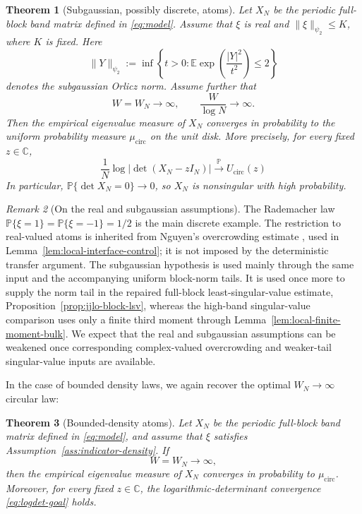 \documentclass[11pt,reqno]{amsart}
\numberwithin{equation}{section}
\newtheorem{theorem}{Theorem}[section]
\theoremstyle{definition}
\theoremstyle{remark}
\newtheorem{remark}[theorem]{Remark}
\newcommand{\C}{\mathbb C}
\newcommand{\E}{\mathbb E}
\newcommand{\Pp}{\mathbb P}
\newcommand{\1}{\mathbf 1}
\newcommand{\cir}{\mathrm{circ}}
\renewcommand{\P}{\mathbb P}
\begin{document}
\begin{theorem}[Subgaussian, possibly discrete, atoms]
\label{thm:main}
Let \(X_N\) be the periodic full-block band matrix defined in
\eqref{eq:model}.  Assume that \(\xi\) is real and
\(\|\xi\|_{\psi_2}\le K\), where \(K\) is fixed.  Here
\[
 \|Y\|_{\psi_2}:=\inf\left\{t>0:
   \E\exp\left(\frac{|Y|^2}{t^2}\right)\leq2\right\}
\]
denotes the subgaussian Orlicz norm.  Assume further that
\begin{equation}
 W=W_N\longrightarrow\infty,
 \qquad \frac{W}{\log N}\longrightarrow\infty.
 \label{eq:bandwidth}
\end{equation}
Then the empirical eigenvalue measure of \(X_N\) converges in probability
to the uniform probability measure \(\mu_{\cir}\) on the unit disk.
More precisely, for every fixed \(z\in\C\),
\begin{equation}
 \frac1N\log|\det(X_N-zI_N)|
 \xrightarrow{\mathbb P}
 U_{\cir}(z)
 \label{eq:logdet-goal}
\end{equation}
In particular, \(\Pp\{\det X_N=0\}\to0\), so \(X_N\) is nonsingular
with high probability.
\end{theorem}

\begin{remark}[On the real and subgaussian assumptions]
The Rademacher law \(\P\{\xi=1\}=\P\{\xi=-1\}=1/2\) is the main
discrete example.  The restriction to real-valued atoms is inherited
from Nguyen's overcrowding estimate \cite[Theorem~1.4]{Nguyen}, used in
Lemma~\ref{lem:local-interface-control}; it is not imposed by the
deterministic transfer argument.  The subgaussian hypothesis is used
mainly through the same input and the accompanying uniform block-norm
tails.  It is used once more to supply the norm tail in the repaired
full-block least-singular-value estimate,
Proposition~\ref{prop:jjlo-block-lsv}, whereas the high-band
singular-value comparison uses only a finite third moment through
Lemma~\ref{lem:local-finite-moment-bulk}.  We expect that the real and
subgaussian assumptions can be weakened once corresponding complex-valued
overcrowding and weaker-tail singular-value inputs are available.\end{remark}

In the case of bounded density laws, we again recover the optimal $W_N\to\infty$ circular law:

\begin{theorem}[Bounded-density atoms]
\label{thm:density-main}
Let \(X_N\) be the periodic full-block band matrix defined in
\eqref{eq:model}, and assume that \(\xi\) satisfies
Assumption~\ref{ass:indicator-density}.
If
\begin{equation}
 W=W_N\longrightarrow\infty,
 \label{eq:density-bandwidth}
\end{equation}
then the empirical eigenvalue measure of \(X_N\) converges in probability
to \(\mu_{\cir}\).  Moreover, for every fixed \(z\in\C\), the
logarithmic-determinant convergence
\eqref{eq:logdet-goal} holds.
\end{theorem}
\end{document}
